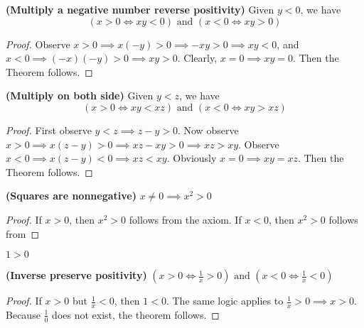 \documentclass{report}
\begin{document}
\begin{theorem}
\label{1.2.3}
  
\textbf{(Multiply a negative number reverse positivity)} Given $y<0$, we have
\begin{equation*}
  (x>0\iff xy<0)\text{ and }(x<0\iff xy>0)
\end{equation*}
\end{theorem}
\begin{proof}
Observe $x>0\implies x(-y)>0\implies -xy>0\implies xy<0$, and 
$x<0\implies (-x)(-y)>0\implies xy>0$. Clearly, $x=0\implies xy=0$. Then the Theorem follows. 
\end{proof}
\begin{theorem}
\label{1.2.4}
\textbf{(Multiply on both side)}  Given $y<z$, we have
\begin{equation*}
  (x>0\iff xy<xz)\text{ and }(x<0\iff xy>xz)
\end{equation*}
\end{theorem}
\begin{proof}
First observe $y<z\implies z-y>0$. Now observe $x>0\implies x(z-y)>0\implies xz-xy>0\implies xz>xy$. 
Observe  $x<0\implies x(z-y)<0\implies xz<xy$. Obviously $x=0\implies  xy=xz$. Then the Theorem follows.
\end{proof}
\begin{theorem}
\label{1.2.5}
  \textbf{(Squares are nonnegative)} $x\neq 0\implies x^2>0$
\end{theorem}
\begin{proof}
  If $x>0$, then $x^2>0$ follows from the axiom. If $x<0$, then $x^2>0$ follows from 
\end{proof}

\begin{corollary}
\label{1.2.6}
$1>0$
\end{corollary}

\begin{theorem}
\label{1.2.7}
\textbf{(Inverse preserve positivity)} $(x>0\iff \frac{1}{x}>0)\text{ and }(x<0\iff \frac{1}{x}<0)$ 
\end{theorem}
\begin{proof}
If $x>0$ but $\frac{1}{x}<0$, then $1<0$. The same logic applies to  $\frac{1}{x}>0\implies x>0$. Because $\frac{1}{0}$ does not exist, the theorem follows.
\end{proof}
\end{document}
